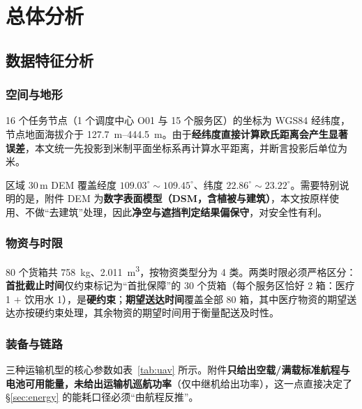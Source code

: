 \section{总体分析}
\subsection{数据特征分析}\label{sec:data}

\subsubsection{空间与地形}

16 个任务节点（1 个调度中心 O01 与 15 个服务区）的坐标为 WGS84 经纬度，节点地面海拔介于 \SIrange{127.7}{444.5}{m}。由于\textbf{经纬度直接计算欧氏距离会产生显著误差}，本文统一先投影到米制平面坐标系再计算水平距离，并断言投影后单位为米。

区域 30\,m DEM 覆盖经度 $109.03^\circ\sim109.45^\circ$、纬度 $22.86^\circ\sim23.22^\circ$。需要特别说明的是，附件 DEM 为\textbf{数字表面模型（DSM，含植被与建筑）}，本文按原样使用、不做“去建筑”处理，因此\textbf{净空与遮挡判定结果偏保守}，对安全性有利。

\subsubsection{物资与时限}

80 个货箱共 \SI{758}{kg}、\SI{2.011}{m^3}，按物资类型分为 4 类。两类时限必须严格区分：\textbf{首批截止时间}仅约束标记为“首批保障”的 30 个货箱（每个服务区恰好 2 箱：医疗 1 $+$ 饮用水 1），是\textbf{硬约束}；\textbf{期望送达时间}覆盖全部 80 箱，其中医疗物资的期望送达亦按硬约束处理，其余物资的期望时间用于衡量配送及时性。

\subsubsection{装备与链路}

三种运输机型的核心参数如表~\ref{tab:uav} 所示。附件\textbf{只给出空载/满载标准航程与电池可用能量，未给出运输机巡航功率}（仅中继机给出功率），这一点直接决定了 \S\ref{sec:energy} 的能耗口径必须“由航程反推”。

